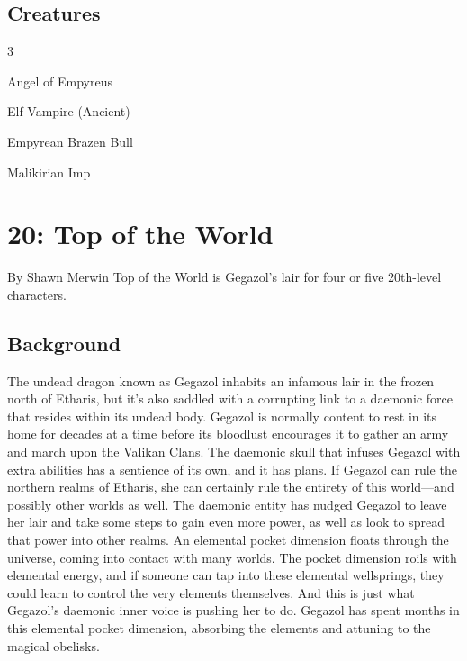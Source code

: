 \documentclass[10pt,a4paper,twoside,twocolumn,openany,bg=print,nodeprecatedcode]{dndbook}
\begin{document}
\section{Creatures}

\begin{itemize}
\begin{multicols}{3}
\item Angel of Empyreus
\item Elf Vampire (Ancient)
\item Empyrean Brazen Bull
\item Malikirian Imp
\end{multicols}

\end{itemize}

\chapter{20: Top of the World}
By Shawn Merwin
Top of the World is Gegazol's lair for four or five 20th-level characters.
\section{Background}
The undead dragon known as Gegazol inhabits an infamous lair in the frozen north of Etharis, but it's also saddled with a corrupting link to a daemonic force that resides within its undead body. Gegazol is normally content to rest in its home for decades at a time before its bloodlust encourages it to gather an army and march upon the Valikan Clans.
The daemonic skull that infuses Gegazol with extra abilities has a sentience of its own, and it has plans. If Gegazol can rule the northern realms of Etharis, she can certainly rule the entirety of this world—and possibly other worlds as well. The daemonic entity has nudged Gegazol to leave her lair and take some steps to gain even more power, as well as look to spread that power into other realms.
An elemental pocket dimension floats through the universe, coming into contact with many worlds. The pocket dimension roils with elemental energy, and if someone can tap into these elemental wellsprings, they could learn to control the very elements themselves. And this is just what Gegazol's daemonic inner voice is pushing her to do.
Gegazol has spent months in this elemental pocket dimension, absorbing the elements and attuning to the magical obelisks.
\end{document}
